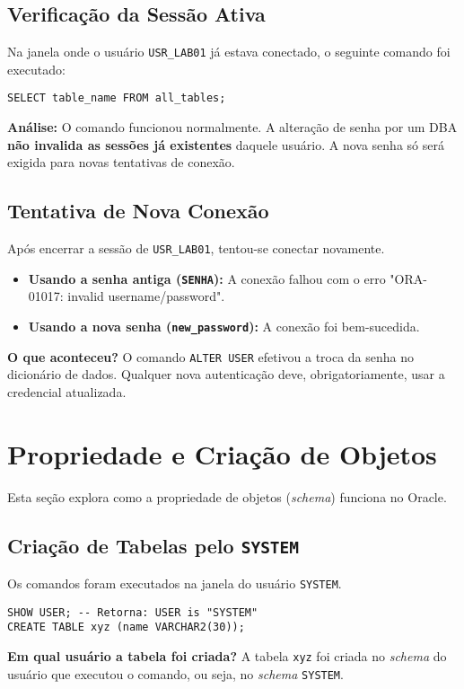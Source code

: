 \documentclass[a4paper, 12pt]{article}
\begin{document}
\subsection{Verificação da Sessão Ativa}
Na janela onde o usuário \texttt{USR\_LAB01} já estava conectado, o seguinte comando foi executado:
\begin{lstlisting}
SELECT table_name FROM all_tables;
\end{lstlisting}
\textbf{Análise:} O comando funcionou normalmente. A alteração de senha por um DBA \textbf{não invalida as sessões já existentes} daquele usuário. A nova senha só será exigida para novas tentativas de conexão.

\subsection{Tentativa de Nova Conexão}
Após encerrar a sessão de \texttt{USR\_LAB01}, tentou-se conectar novamente.
\begin{itemize}
    \item \textbf{Usando a senha antiga (\texttt{SENHA}):} A conexão falhou com o erro "ORA-01017: invalid username/password".
    \item \textbf{Usando a nova senha (\texttt{new\_password}):} A conexão foi bem-sucedida.
\end{itemize}
\textbf{O que aconteceu?} O comando \texttt{ALTER USER} efetivou a troca da senha no dicionário de dados. Qualquer nova autenticação deve, obrigatoriamente, usar a credencial atualizada.

\section{Propriedade e Criação de Objetos}
Esta seção explora como a propriedade de objetos (\textit{schema}) funciona no Oracle.

\subsection{Criação de Tabelas pelo \texttt{SYSTEM}}
Os comandos foram executados na janela do usuário \texttt{SYSTEM}.
\begin{lstlisting}
SHOW USER; -- Retorna: USER is "SYSTEM"
CREATE TABLE xyz (name VARCHAR2(30));
\end{lstlisting}
\textbf{Em qual usuário a tabela foi criada?} A tabela \texttt{xyz} foi criada no \textit{schema} do usuário que executou o comando, ou seja, no \textit{schema} \texttt{SYSTEM}.
\end{document}
